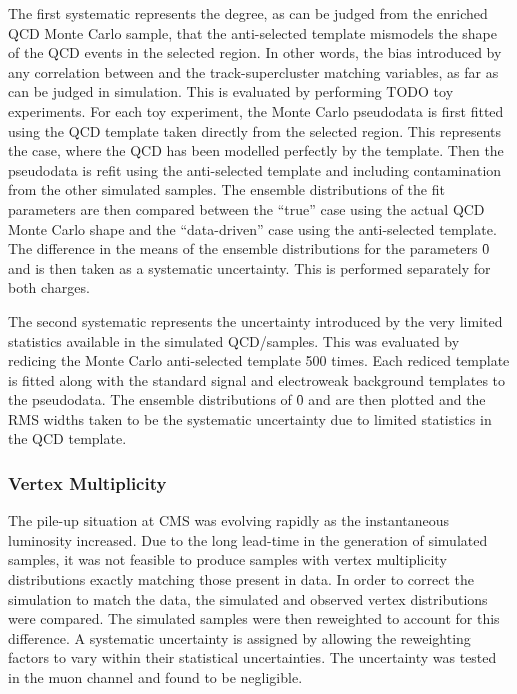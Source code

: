 The first systematic represents the degree, as can be judged from the enriched
\ac{QCD} Monte Carlo sample, that the anti-selected template mismodels the \LP
shape of the \ac{QCD} events in the selected region. In other words, the bias
introduced by any correlation between \LP and the track-supercluster matching
variables, as far as can be judged in simulation. This is evaluated by
performing TODO toy experiments. For each toy experiment, the Monte Carlo
pseudodata is first fitted using the \ac{QCD} template taken directly from the
selected region. This represents the case, where the \ac{QCD} has been modelled
perfectly by the template. Then the pseudodata is refit using the anti-selected
template and including contamination from the other simulated samples. The
ensemble distributions of the fit parameters are then compared between the
``true'' case using the actual \ac{QCD} Monte Carlo shape and the
``data-driven'' case using the anti-selected template. The difference in the
means of the ensemble distributions for the parameters \f0 and \fLmfR is then
taken as a systematic uncertainty. This is performed separately for both
charges.

The second systematic represents the uncertainty introduced by the very limited
statistics available in the simulated \ac{QCD}/\gammajets samples. This was
evaluated by redicing the Monte Carlo anti-selected template 500 times. Each
rediced template is fitted along with the standard signal and electroweak
background templates to the pseudodata. The ensemble distributions of \f0 and
\fLmfR are then plotted and the \ac{RMS} widths taken to be the systematic
uncertainty due to limited statistics in the \ac{QCD} template.

\subsubsection{Vertex Multiplicity}
The pile-up situation at \ac{CMS} was evolving rapidly as the instantaneous
luminosity increased. Due to the long lead-time in the generation of simulated
samples, it was not feasible to produce samples with vertex multiplicity
distributions exactly matching those present in data. In order to correct the
simulation to match the data, the simulated and observed vertex distributions
were compared. The simulated samples were then reweighted to account for this
difference. A systematic uncertainty is assigned by allowing the reweighting
factors to vary within their statistical uncertainties. The uncertainty was
tested in the muon channel and found to be negligible.

